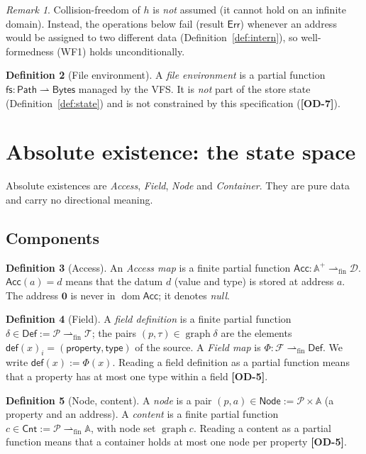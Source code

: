 \documentclass[11pt,a4paper]{article}
\theoremstyle{definition}
\newtheorem{definition}{Definition}[section]
\theoremstyle{plain}
\theoremstyle{remark}
\newtheorem{remark}[definition]{Remark}
\newcommand{\od}[1]{\textsf{\textbf{\textcolor{BrickRed}{[OD-#1]}}}}
\newcommand{\Typ}{\mathcal{T}}
\newcommand{\Dat}{\mathcal{D}}
\newcommand{\Adr}{\mathbb{A}}
\newcommand{\Prp}{\mathcal{P}}
\newcommand{\Fld}{\mathcal{F}}
\newcommand{\Pth}{\mathsf{Path}}
\newcommand{\Nod}{\mathsf{Node}}
\newcommand{\Cnt}{\mathsf{Cnt}}
\newcommand{\Def}{\mathsf{Def}}
\newcommand{\nul}{\mathbf{0}}
\newcommand{\Err}{\mathsf{Err}}
\newcommand{\pfun}{\rightharpoonup}
\newcommand{\pfin}{\rightharpoonup_{\mathrm{fin}}}
\newcommand{\dom}{\operatorname{dom}}
\newcommand{\graph}{\operatorname{graph}}
\newcommand{\Acc}{\mathsf{Acc}}
\begin{document}
\begin{remark}
Collision-freedom of $h$ is \emph{not} assumed (it cannot hold on an infinite domain).
Instead, the operations below fail (result $\Err$) whenever an address would be assigned to two different data (Definition~\ref{def:intern}),
so well-formedness (WF1) holds unconditionally.
\end{remark}

\begin{definition}[File environment]\label{def:fs}
A \emph{file environment} is a partial function $\mathsf{fs}:\Pth\pfun\mathsf{Bytes}$ managed by the VFS.
It is \emph{not} part of the store state (Definition~\ref{def:state}) and is not constrained by this specification (\od{7}).
\end{definition}

\section{Absolute existence: the state space}
\label{sec:state}

Absolute existences are \emph{Access}, \emph{Field}, \emph{Node} and \emph{Container}.
They are pure data and carry no directional meaning.

\subsection{Components}

\begin{definition}[Access]\label{def:access}
An \emph{Access map} is a finite partial function $\Acc:\Adr^{+}\pfin\Dat$.
$\Acc(a)=d$ means that the datum $d$ (value and type) is stored at address $a$.
The address $\nul$ is never in $\dom\Acc$; it denotes \emph{null}.
\end{definition}

\begin{definition}[Field]\label{def:field}
A \emph{field definition} is a finite partial function $\delta\in\Def:=\Prp\pfin\Typ$;
the pairs $(p,\tau)\in\graph\delta$ are the elements $\mathsf{def}(x)_i=(\mathsf{property},\mathsf{type})$ of the source.
A \emph{Field map} is $\Phi:\Fld\pfin\Def$. We write $\mathsf{def}(x):=\Phi(x)$.
Reading a field definition as a partial function means that a property has at most one type within a field \od{5}.
\end{definition}

\begin{definition}[Node, content]\label{def:node}
A \emph{node} is a pair $(p,a)\in\Nod:=\Prp\times\Adr$ (a property and an address).
A \emph{content} is a finite partial function $c\in\Cnt:=\Prp\pfin\Adr$, with node set $\graph c$.
Reading a content as a partial function means that a container holds at most one node per property \od{5}.
\end{definition}
\end{document}
